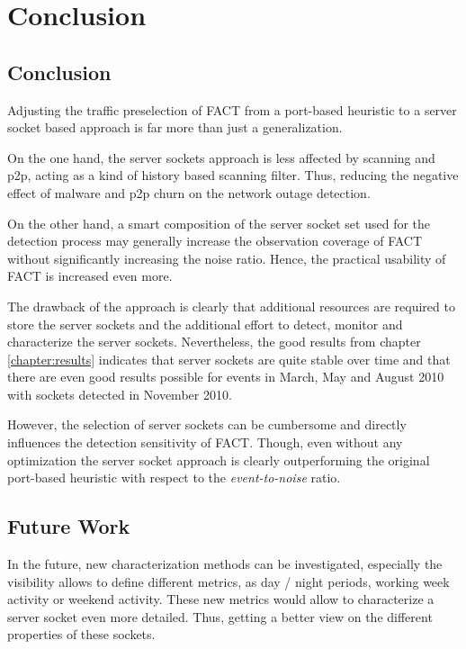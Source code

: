 \chapter{Conclusion\label{Conclusion}}

\section{Conclusion}
Adjusting the traffic preselection of \gls{FACT} from a port-based heuristic to 
a \gls{server socket} based approach is far more than just a generalization. 

On the one hand, the \glspl{server socket} approach is less affected by scanning 
and \gls{p2p}, acting as a kind of history based scanning filter. Thus, reducing 
the negative effect of malware and \gls{p2p} churn on the network outage 
detection. 

On the other hand, a smart composition of the \gls{server socket} set used for 
the detection process may generally increase the observation coverage of 
\gls{FACT} without significantly increasing the noise ratio. Hence, the 
practical usability of \gls{FACT} is increased even more.

The drawback of the approach is clearly that additional resources are required 
to store the \glspl{server socket} and the additional effort to detect, monitor 
and characterize the \glspl{server socket}. 
Nevertheless, the good results from chapter \ref{chapter:results} indicates that 
server sockets are quite stable over time and that there are even good results 
possible for events in March, May and August 2010 with sockets detected in 
November 2010. 

However, the selection of \glspl{server socket} can be cumbersome and directly 
influences the detection sensitivity of \gls{FACT}. Though, even without any 
optimization the \gls{server socket} approach is clearly outperforming the 
original port-based heuristic with respect to the \emph{event-to-noise} ratio. 

\section{Future Work}

In the future, new characterization methods can be investigated, especially the 
visibility allows to define different metrics, as day / night periods, working 
week activity or weekend activity. These new metrics would allow to characterize 
a \gls{server socket} even more detailed. Thus, getting a better view on the 
different properties of these sockets. 

